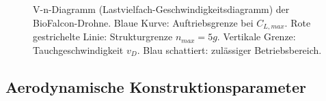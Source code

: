 ﻿\documentclass[12pt,a4paper]{article}
\theoremstyle{remark}
\begin{document}
\begin{figure}[H]
		\caption{V-n-Diagramm (Lastvielfach-Geschwindigkeitsdiagramm) der BioFalcon-Drohne.
			Blaue Kurve: Auftriebsgrenze bei $C_{L,max}$. Rote gestrichelte Linie:
			Strukturgrenze $n_{max} = 5g$. Vertikale Grenze: Tauchgeschwindigkeit $v_D$.
			Blau schattiert: zulässiger Betriebsbereich.}
		\label{fig:vn_diagramm}
	\end{figure}
	
	\subsection{Aerodynamische Konstruktionsparameter}
	\label{sec:kons_zusammenfassung}
	
\end{document}
